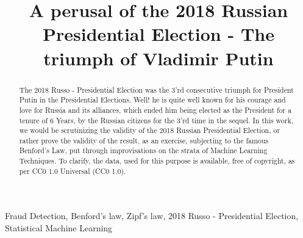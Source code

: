 \documentclass[conference]{IEEEtran}
\begin{document}
\title{A perusal of the 2018 Russian Presidential Election - The triumph of Vladimir Putin\\}

\author{
}

\maketitle

\begin{abstract}
The 2018 Russo - Presidential Election was the 3’rd consecutive triumph for President Putin in the Presidential Elections. Well! he is quite well known for his courage and love for Russia and its alliances, which ended him being elected as the President for a tenure of 6 Years, by the Russian citizens for the 3’rd time in the sequel. In this work, we would be scrutinizing the validity of the 2018 Russian Presidential Election, or rather prove the validity of the result, as an exercise, subjecting to the famous Benford’s Law, put through improvisations on the strata of Machine Learning Techniques. To clarify, the data, used for this purpose is available, free of copyright, as per CC0 1.0 Universal (CC0 1.0). \\
\end{abstract}

\begin{IEEEkeywords}
Fraud Detection, Benford’s law, Zipf’s law, 2018 Russo - Presidential Election, Statistical Machine Learning
\end{IEEEkeywords}
\end{document}
